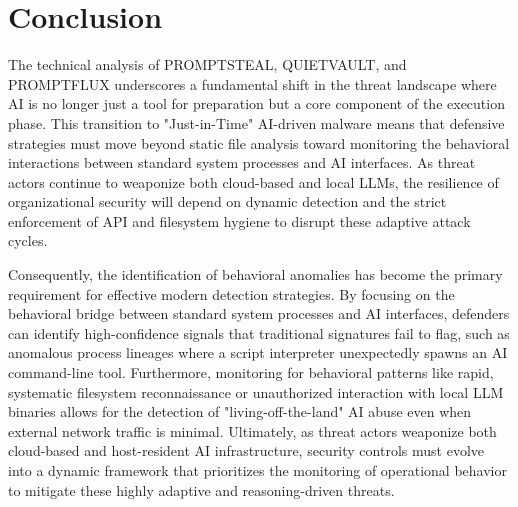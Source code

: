 \documentclass[11pt,a4paper]{article}
\begin{document}
\section{Conclusion}
The technical analysis of PROMPTSTEAL, QUIETVAULT, and PROMPTFLUX underscores a fundamental shift in the threat landscape where AI is no longer just a tool for preparation but a core component of the execution phase. This transition to "Just-in-Time" AI-driven malware means that defensive strategies must move beyond static file analysis toward monitoring the behavioral interactions between standard system processes and AI interfaces. As threat actors continue to weaponize both cloud-based and local LLMs, the resilience of organizational security will depend on dynamic detection and the strict enforcement of API and filesystem hygiene to disrupt these adaptive attack cycles.

Consequently, the identification of behavioral anomalies has become the primary requirement for effective modern detection strategies. By focusing on the behavioral bridge between standard system processes and AI interfaces, defenders can identify high-confidence signals that traditional signatures fail to flag, such as anomalous process lineages where a script interpreter unexpectedly spawns an AI command-line tool. Furthermore, monitoring for behavioral patterns like rapid, systematic filesystem reconnaissance or unauthorized interaction with local LLM binaries allows for the detection of "living-off-the-land" AI abuse even when external network traffic is minimal. Ultimately, as threat actors weaponize both cloud-based and host-resident AI infrastructure, security controls must evolve into a dynamic framework that prioritizes the monitoring of operational behavior to mitigate these highly adaptive and reasoning-driven threats.

\newpage
\nocite{*}
\printbibliography[heading=bibintoc,title={References}]
\end{document}
